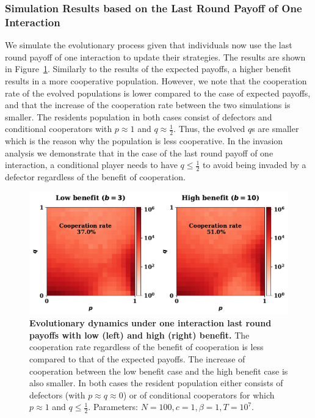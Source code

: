 \documentclass[11pt]{article}
\theoremstyle{plainCl1}
\theoremstyle{plainCl2}
\begin{document}
\subsubsection*{Simulation Results based on the Last Round Payoff of One Interaction}

We simulate the evolutionary process given that individuals now use the last
round payoff of one interaction to update their strategies. The results are
shown in Figure~\ref{fig:one_interaction_last_round_payoffs_results}. Similarly
to the results of the expected payoffs, a higher benefit results in a more
cooperative population. However, we note that the cooperation rate of the
evolved populations is lower compared to the case of expected payoffs, and that
the increase of the cooperation rate between the two simulations is smaller. The
residents population in both cases consist of defectors and conditional
cooperators with \(p \approx 1\) and  \(q \approx \frac{1}{2}\). Thus, the
evolved \(q\)s are smaller which is the reason why the population is less
cooperative. In the invasion analysis we demonstrate that in the case of the
last round payoff of one interaction, a conditional player needs to have \(q
\leq \frac{1}{2}\) to avoid being invaded by a defector regardless of the
benefit of cooperation.

\begin{figure}[!htbp]
  \centering 
  \includegraphics[width=.70\textwidth]{static/one_interaction_last_round_donation_game.pdf}
  \caption{\textbf{Evolutionary dynamics under one interaction last round
  payoffs with low (left) and high (right) benefit.} The cooperation rate
  regardless of the benefit of cooperation is less compared to that of the
  expected payoffs. The increase of cooperation between the low benefit case and
  the high benefit case is also smaller. In both cases the resident population
  either consists of defectors (with
  \(p \approx q \approx 0\)) or of conditional cooperators for which \(p \approx
  1\) and \(q \leq \frac{1}{2}\). Parameters: \(N =100, c=1, \beta=1, T=10^{7}\).
  }\label{fig:one_interaction_last_round_payoffs_results}
\end{figure}
\end{document}
